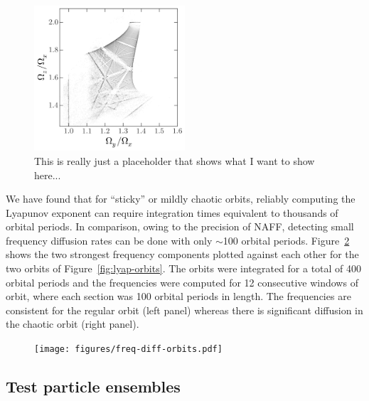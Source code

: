 \documentclass[letterpaper,12pt,preprint]{aastex}
\begin{document}
\begin{figure}[!h]
\begin{center}
\includegraphics[width=0.5\textwidth]{figures/log-freqmap.png}
\caption{This is really just a placeholder that shows what I want to show here...} \label{fig:logfreqs}
\end{center}
\end{figure}

We have found that for ``sticky'' or mildly chaotic orbits, reliably computing the Lyapunov exponent can require integration times equivalent to thousands of orbital periods. In comparison, owing to the precision of NAFF, detecting small frequency diffusion rates can be done with only $\sim$100 orbital periods. Figure~\ref{fig:fdiff-orbits} shows the two strongest frequency components plotted against each other for the two orbits of Figure~\ref{fig:lyap-orbits}. The orbits were integrated for a total of 400 orbital periods and the frequencies were computed for 12 consecutive windows of orbit, where each section was 100 orbital periods in length. The frequencies are consistent for the regular orbit (left panel) whereas there is significant diffusion in the chaotic orbit (right panel).

\begin{figure}[!h]
\begin{center}
\texttt{[image: figures/freq-diff-orbits.pdf]}
\caption{ } \label{fig:fdiff-orbits}
\end{center}
\end{figure}

\subsection{Test particle ensembles} \label{sec:ensemble}
\end{document}
